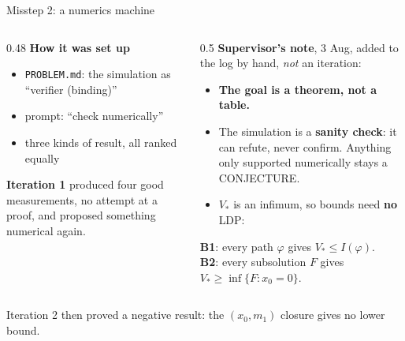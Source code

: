 \documentclass[11pt,aspectratio=169]{beamer}
\newcommand{\datei}[1]{\texttt{#1}}
\begin{document}
\begin{frame}{Misstep 2: a numerics machine}
  \small
  \begin{columns}[T]
    \begin{column}{0.48\textwidth}
      \textbf{How it was set up}
      \begin{itemize}
      \item \datei{PROBLEM.md}: the simulation as \enquote{verifier (binding)}
      \item prompt: \enquote{check numerically}
      \item three kinds of result, all ranked equally
      \end{itemize}
      \textbf{Iteration 1} produced four good measurements, no attempt at a proof, and
      proposed something numerical again.
    \end{column}
    \begin{column}{0.5\textwidth}
      \textbf{Supervisor's note}, 3 Aug, added to the log by hand, \emph{not} an
      iteration:
      \begin{itemize}
      \item \textbf{The goal is a theorem, not a table.}
      \item The simulation is a \textbf{sanity check}: it can refute, never
        confirm. Anything only supported numerically stays a CONJECTURE.
      \item $V_\ast$ is an infimum, so bounds need \textbf{no} LDP:
      \end{itemize}
      \footnotesize
      \textbf{B1}: every path $\varphi$ gives $V_\ast\le I(\varphi)$.\\
      \textbf{B2}: every subsolution $F$ gives $V_\ast\ge\inf\{F: x_0=0\}$.
    \end{column}
  \end{columns}
  \bigskip
  Iteration 2 then proved a negative result: the $(x_0,m_1)$ closure gives no lower
  bound.
\end{frame}
\end{document}
